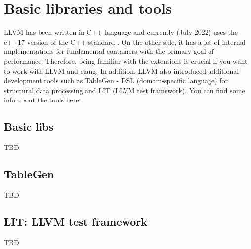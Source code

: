 \chapter{Basic libraries and tools}
LLVM has been written in C++ language and currently (July 2022) uses the c++17
version of the C++ standard \cite{llvm:cpp17migration}. On the other side, it
has a lot of internal implementations for fundamental containers with the
primary goal of performance. Therefore, being familiar with the extensions is
crucial if you want to work with LLVM and clang. In addition, LLVM also
introduced additional development tools such as TableGen - DSL (domain-specific
language) for structural data processing and LIT (LLVM test framework). You can
find some info about the tools here. 

\section{Basic libs}
TBD

\section{TableGen}
TBD

\section{LIT: LLVM test framework}
TBD

